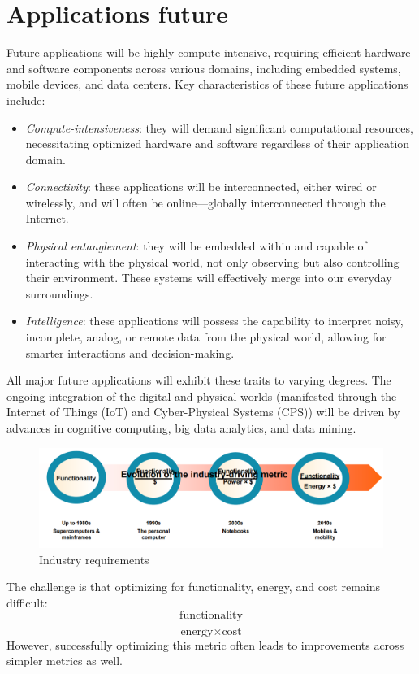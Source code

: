 \section{Applications future}

Future applications will be highly compute-intensive, requiring efficient hardware and software components across various domains, including embedded systems, mobile devices, and data centers. 
Key characteristics of these future applications include:
\begin{itemize}
    \item \textit{Compute-intensiveness}: they will demand significant computational resources, necessitating optimized hardware and software regardless of their application domain.
    \item \textit{Connectivity}: these applications will be interconnected, either wired or wirelessly, and will often be online—globally interconnected through the Internet.
    \item \textit{Physical entanglement}: they will be embedded within and capable of interacting with the physical world, not only observing but also controlling their environment. 
        These systems will effectively merge into our everyday surroundings.
    \item \textit{Intelligence}: these applications will possess the capability to interpret noisy, incomplete, analog, or remote data from the physical world, allowing for smarter interactions and decision-making.
\end{itemize}
All major future applications will exhibit these traits to varying degrees. 
The ongoing integration of the digital and physical worlds (manifested through the Internet of Things (IoT) and Cyber-Physical Systems (CPS)) will be driven by advances in cognitive computing, big data analytics, and data mining.
\begin{figure}[H]
    \centering
    \includegraphics[width=0.75\linewidth]{images/time.png}
    \caption{Industry requirements}
\end{figure}
The challenge is that optimizing for functionality, energy, and cost remains difficult:
\[\dfrac{\text{functionality}}{\text{energy}\times\text{cost}}\]
However, successfully optimizing this metric often leads to improvements across simpler metrics as well.

